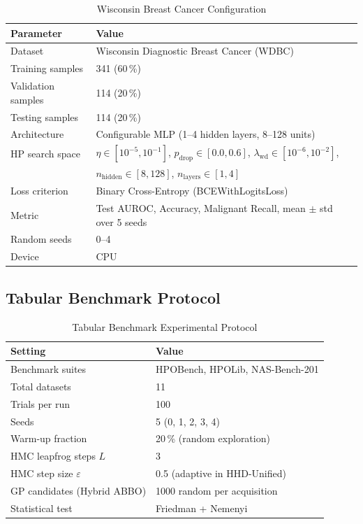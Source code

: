 \documentclass[11pt]{article}
\theoremstyle{definition}
\begin{document}
\begin{table}[H]
\centering
\caption{Wisconsin Breast Cancer Configuration}
\label{tab:breast_cancer_setup}
\renewcommand{\arraystretch}{1.2}
\begin{tabular}{ll}
\toprule
Parameter & Value \\
\midrule
Dataset              & Wisconsin Diagnostic Breast Cancer (WDBC) \\
Training samples     & 341 (60\,\%) \\
Validation samples   & 114 (20\,\%) \\
Testing samples      & 114 (20\,\%) \\
Architecture         & Configurable MLP (1--4 hidden layers, 8--128 units) \\
HP search space      & $\eta\in[10^{-5},10^{-1}]$,
                       $p_{\mathrm{drop}}\in[0.0,0.6]$,
                       $\lambda_{\mathrm{wd}}\in[10^{-6},10^{-2}]$, \\
                     & $n_{\mathrm{hidden}}\in[8,128]$,
                       $n_{\mathrm{layers}}\in[1,4]$ \\
Loss criterion       & Binary Cross-Entropy (BCEWithLogitsLoss) \\
Metric               & Test AUROC, Accuracy, Malignant Recall, mean $\pm$ std over 5 seeds \\
Random seeds         & 0--4 \\
Device               & CPU \\
\bottomrule
\end{tabular}
\end{table}

\subsection{Tabular Benchmark Protocol}
\begin{table}[H]
\centering
\caption{Tabular Benchmark Experimental Protocol}
\label{tab:tabular_protocol}
\renewcommand{\arraystretch}{1.2}
\begin{tabular}{ll}
\toprule
Setting & Value \\
\midrule
Benchmark suites     & HPOBench, HPOLib, NAS-Bench-201 \\
Total datasets       & 11 \\
Trials per run       & 100 \\
Seeds                & 5 (0, 1, 2, 3, 4) \\
Warm-up fraction     & 20\,\% (random exploration) \\
HMC leapfrog steps $L$ & 3 \\
HMC step size $\varepsilon$ & 0.5 (adaptive in HHD-Unified) \\
GP candidates (Hybrid ABBO) & 1000 random per acquisition \\
Statistical test     & Friedman + Nemenyi~\cite{demsar2006} \\
\bottomrule
\end{tabular}
\end{table}
\end{document}
